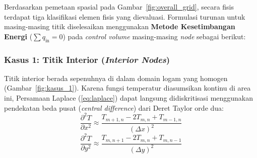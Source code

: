 \documentclass[12pt,a4paper]{article}
\begin{document}
Berdasarkan pemetaan spasial pada Gambar~\ref{fig:overall_grid}, secara fisis terdapat tiga klasifikasi elemen fisis yang dievaluasi. Formulasi turunan untuk masing-masing titik diselesaikan menggunakan \textbf{Metode Kesetimbangan Energi} ($\sum q_{\text{in}} = 0$) pada \textit{control volume} masing-masing \textit{node} sebagai berikut:

\subsubsection*{Kasus 1: Titik Interior (\textit{Interior Nodes})}
Titik interior berada sepenuhnya di dalam domain logam yang homogen (Gambar~\ref{fig:kasus_1}). Karena fungsi temperatur diasumsikan kontinu di area ini, Persamaan Laplace (\ref{eq:laplace}) dapat langsung didiskritisasi menggunakan pendekatan beda pusat (\textit{central difference}) dari Deret Taylor orde dua:
\begin{equation} \label{eq:taylor_x}
    \frac{\partial^2 T}{\partial x^2} \approx \frac{T_{m+1,n} - 2T_{m,n} + T_{m-1,n}}{(\Delta x)^2}
\end{equation}
\begin{equation} \label{eq:taylor_y}
    \frac{\partial^2 T}{\partial y^2} \approx \frac{T_{m,n+1} - 2T_{m,n} + T_{m,n-1}}{(\Delta y)^2}
\end{equation}
\end{document}
